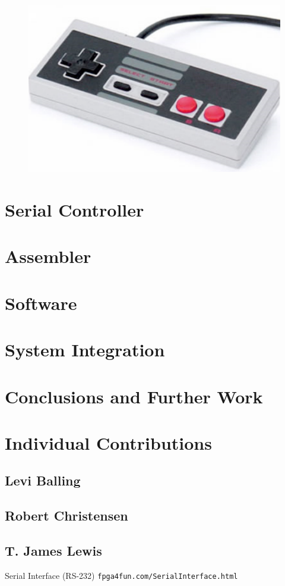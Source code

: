 \documentclass{article}
\begin{document}
\begin{figure}[h!]
	\centering
	\includegraphics[width = .5\textwidth]{nescontroller.png}
	\label{nes}
\end{figure}

\section{Serial Controller}

\section{Assembler}

\section{Software}

\section{System Integration}

\section{Conclusions and Further Work}

\section{Individual Contributions}

\subsection{Levi Balling}

\subsection{Robert Christensen}

\subsection{T. James Lewis}

\begin{thebibliography}{99}

 Serial Interface (RS-232) \texttt{fpga4fun.com/SerialInterface.html}

\end{thebibliography}
\end{document}
